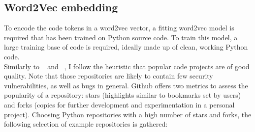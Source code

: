 \documentclass[
a4paper,
pagesize,
pdftex,
12pt,
twoside, %
BCOR=5mm, %
ngerman,
fleqn,
final,
]{scrartcl}
\begin{document}
	\subsection{Word2Vec embedding}
	To encode the code tokens in a word2vec vector, a fitting word2vec model is required that has been trained on Python source code. To train this model, a large training base of code is required, ideally made up of clean, working Python code.\\
	Similarly to ~\cite{Bhoopchand.2016} and ~\cite{Allamanis.2013}, I follow the  heuristic that popular code projects are of good quality. Note that those repositories are likely to contain few security vulnerabilities, as well as bugs in general. Github offers two metrics to assess the popularity of a repository: stars (highlights similar to bookmarks set by users) and forks (copies for further development and experimentation in a personal project). Choosing Python repositories with a high number of stars and forks, the following selection of example repositories is gathered:
	
\end{document}
